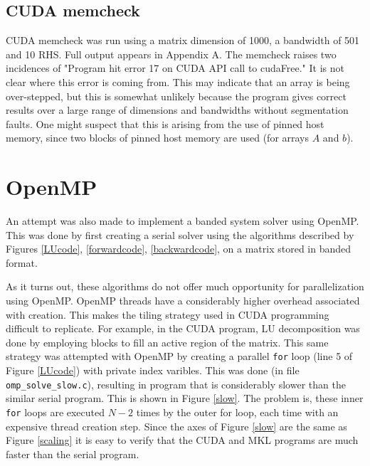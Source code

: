 \documentclass[12pt]{article}
\begin{document}
\subsection{CUDA memcheck}

CUDA memcheck was run using a matrix dimension of 1000, a
bandwidth of 501 and 10 RHS. Full output appears in Appendix A. The
memcheck raises two incidences of "Program hit error 17 on CUDA API call to
cudaFree." It is not clear where this error is coming from. This may
indicate that an array is being over-stepped, but this is somewhat unlikely
because the program gives correct results over a large range of dimensions and
bandwidths without segmentation faults. One might suspect that this is arising from the use of pinned host
memory, since two blocks of pinned host memory are used (for arrays $A$ and
$b$).

\section{OpenMP}
\label{sec:omp}

An attempt was also made to implement a banded system solver using OpenMP. This
was done by first creating a serial solver using the algorithms described by
Figures \ref{LUcode}, \ref{forwardcode}, \ref{backwardcode}, on a matrix
stored in banded format. 

As it turns out, these algorithms do not offer much opportunity for
parallelization using OpenMP. OpenMP threads have a considerably higher
overhead associated with creation. This makes the tiling  strategy used in CUDA
programming difficult to replicate.  For example, in the CUDA program, LU
decomposition was done by employing blocks to fill an active region of the
matrix. This same strategy was attempted with OpenMP by creating a parallel
\texttt{for} loop (line 5 of Figure \ref{LUcode}) with private index varibles.
This was done (in file \texttt{omp\_solve\_slow.c}), resulting in program that
is considerably slower than the similar serial program.  This is shown in
Figure \ref{slow}.  The problem is, these inner \texttt{for} loops are executed $N-2$
times by the outer for loop, each time with an expensive thread creation step.
Since the axes of Figure \ref{slow} are the same as Figure \ref{scaling} it is easy to
verify that the CUDA and MKL programs are much faster than the serial program.
\end{document}
